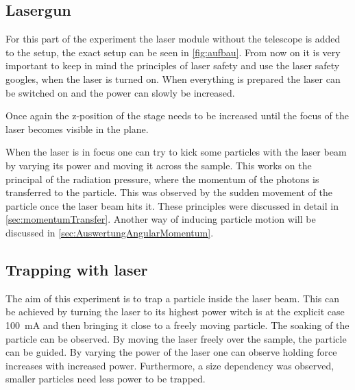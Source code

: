 \documentclass[12pt,english]{scrartcl}
\begin{document}
\subsection{Lasergun}

For this part of the experiment the laser module without the telescope is added
to the setup, the exact setup can be seen in \autoref{fig:aufbau}. From now on
it is very important to keep in mind the principles of laser safety and use the
laser safety googles, when the laser is turned on. When everything is prepared
the laser can be switched on and the power can slowly be increased.

Once again the z-position of the stage needs to be increased until the focus of
the laser becomes visible in the plane.


When the laser is in focus one can try to kick some particles with the laser
beam by varying its power and moving it across the sample. This works on the
principal of the radiation pressure, where the momentum of the photons is
transferred to the particle. This was observed by the sudden movement of the
particle once the laser beam hits it. These principles were discussed in detail
in \autoref{sec:momentumTransfer}. Another way of inducing particle motion will
be discussed in \autoref{sec:AuswertungAngularMomentum}.

\subsection{Trapping with laser}

The aim of this experiment is to trap a particle inside the laser beam. This
can be achieved by turning the laser to its highest power witch is at the
explicit case \SI{100}{\milli\ampere} and then bringing it close to a freely
moving particle. The soaking of the particle can be observed. By moving the
laser freely over the sample, the particle can be guided. By varying the power
of the laser one can observe holding force increases with increased power.
Furthermore, a size dependency was observed, smaller particles need less power
to be trapped.
\end{document}
